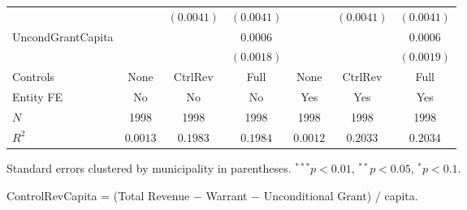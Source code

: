 \begin{table}[H]
\begin{minipage}{\textwidth}
\begin{tabular}{lcccccc}
         &  & $(0.0041)$ & $(0.0041)$ &  & $(0.0041)$ & $(0.0041)$ \\[4pt]
        UncondGrantCapita &  &  & $0.0006$ &  &  & $0.0006$ \\
         &  &  & $(0.0018)$ &  &  & $(0.0019)$ \\[4pt]
        \midrule
        Controls & None & CtrlRev & Full & None & CtrlRev & Full \\
        Entity FE & No & No & No & Yes & Yes & Yes \\
        $N$ & 1998 & 1998 & 1998 & 1998 & 1998 & 1998 \\
        $R^2$ & $0.0013$ & $0.1983$ & $0.1984$ & $0.0012$ & $0.2033$ & $0.2034$ \\
        \bottomrule
    \end{tabular}

    \vspace{6pt}
    {\scriptsize Standard errors clustered by municipality in parentheses. $^{***}p<0.01$, $^{**}p<0.05$, $^{*}p<0.1$.}

    {\scriptsize ControlRevCapita = (Total Revenue $-$ Warrant $-$ Unconditional Grant) / capita.}
    \end{minipage}
\end{table}